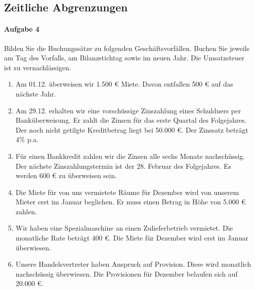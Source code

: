 \documentclass[paper=a4, fontsize=11pt]{scrartcl}
\numberwithin{equation}{section}
\numberwithin{figure}{section}
\numberwithin{table}{section}
\begin{document}
\subsection{Zeitliche Abgrenzungen}
\paragraph{Aufgabe 4}
Bilden Sie die Buchungssätze zu folgenden Geschäftsvorfällen. Buchen Sie jeweils am Tag des Vorfalls, am Bilanzstichtag sowie im neuen Jahr. Die Umsatzsteuer ist zu vernachlässigen. \\
\begin{enumerate}
\item Am 01.12. überweisen wir 1.500 € Miete. Davon entfallen 500 € auf das nächste Jahr. 
\item Am 29.12. erhalten wir eine vorschüssige Zinszahlung eines Schuldners per Banküberweisung. Er zahlt die Zinsen für das erste Quartal des Folgejahres. Der noch nicht getilgte Kreditbetrag liegt bei 50.000 €. Der Zinssatz beträgt $4 \%$ p.a. 
\item Für einen Bankkredit zahlen wir die Zinsen alle sechs Monate nachschüssig. Der nächste Zinszahlungstermin ist der 28. Februar des Folgejahres. Es werden 600 € zu überweisen sein. 
\item Die Miete für von uns vermietete Räume für Dezember wird von unserem Mieter erst im Januar beglichen. Er muss einen Betrag in Höhe von 5.000 € zahlen. 
\item Wir haben eine Spezialmaschine an einen Zulieferbetrieb vermietet. Die monatliche Rate beträgt 400 €. Die Miete für Dezember wird erst im Januar überwiesen. 
\item Unsere Handelsvertreter haben Anspruch auf Provision. Diese wird monatlich nachschüssig überwiesen. Die Provisionen für Dezember belaufen sich auf 20.000 €. 
\end{enumerate}
\end{document}
